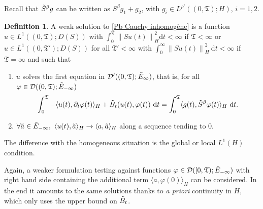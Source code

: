 \documentclass[11pt, letterpaper]{amsart}
\theoremstyle{definition}
\newtheorem{defn}[thm]{Definition}
\theoremstyle{remark}
\numberwithin{equation}{section}
\begin{document}
Recall that $\Tilde{S}^\beta {g}$ can be written as ${S}^\beta {g_1}+ {g_2}$, with $g_i\in L^{\rho'}((0,\mathfrak{T});H)$, $i=1,2$.

\begin{defn} 
A weak solution to  \eqref{Pb Cauchy inhomogène} is a function $u \in L^1((0,\mathfrak{T});D(S))$ with $\int_{0}^{\mathfrak{T}} \left\|Su(t) \right\|_H^2 \mathrm d t <\infty$ if $\mathfrak{T}<\infty$ or $u \in L^1((0,\mathfrak{T}'); D(S))$ for all $\mathfrak{T'}<\infty$ with $\int_{0}^{\infty} \left\|Su(t) \right\|_H^2 \ \mathrm d t <\infty$ if $\mathfrak{T}=\infty$
and such that
\begin{enumerate}
        \item [(i)] $u$ solves the first equation in $\mathcal{D}'((0,\mathfrak{T});\Tilde{E}_{\infty})$, that is, for all $\varphi \in \mathcal{D}((0,\mathfrak{T});\Tilde{E}_{-\infty})$
    \begin{align*}
         \int_{0}^{\mathfrak{T}} -\langle u(t), \partial_t{\varphi }(t)\rangle_H + \Tilde{B}_t(u(t),\varphi(t))\ \mathrm d t 
        = \int_{0}^{\mathfrak{T}} 
        \langle {g}(t), \Tilde{S}^\beta \varphi(t)\rangle_{H} \ \mathrm d t.
    \end{align*}
    
    \item[(ii)] $
        \forall \Tilde{a} \in \Tilde{E}_{-\infty}, \ \langle u(t),\Tilde{a} \rangle_H \rightarrow \langle  a, \Tilde{a}\rangle_H
   $ along a sequence tending to 0.
\end{enumerate}
     
    
\end{defn}

The difference with the homogeneous situation is the global or local $L^1(H)$ condition.
        
Again, a weaker formulation testing against functions $\varphi \in \mathcal{D}([0,\mathfrak{T});\Tilde{E}_{-\infty})$
with right hand side containing the additional term $\langle a, \varphi(0) \rangle_{H}$ can be considered. In the end it amounts to the same solutions thanks to \textit{a priori} continuity in $H$,  which only uses the upper bound on $\Tilde{B}_t$.
\end{document}

